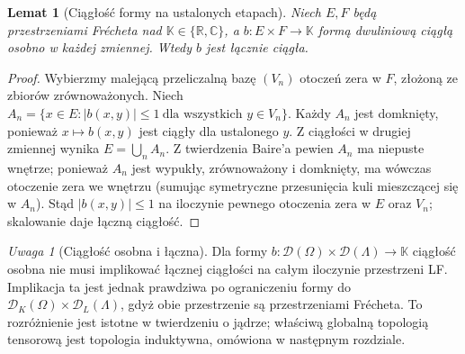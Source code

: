 \documentclass[11pt,a4paper]{article}
\numberwithin{equation}{section}
\theoremstyle{plain}
\newtheorem{lemat}[twierdzenie]{Lemat}
\theoremstyle{definition}
\theoremstyle{remark}
\newtheorem{uwaga}[twierdzenie]{Uwaga}
\newcommand{\R}{\mathbb R}
\newcommand{\C}{\mathbb C}
\newcommand{\K}{\mathbb K}
\begin{document}
\begin{lemat}[Ciągłość formy na ustalonych etapach]
\label{lem:separate-joint23}
Niech $E,F$ będą przestrzeniami Frécheta nad
$\K\in\{\R,\C\}$, a $b:E\times F\to\K$
formą dwuliniową ciągłą osobno w każdej zmiennej.
Wtedy $b$ jest łącznie ciągła.
\end{lemat}
\begin{proof}
Wybierzmy malejącą przeliczalną bazę
$(V_n)$ otoczeń zera w $F$, złożoną ze zbiorów
zrównoważonych. Niech
$A_n=\{x\in E: |b(x,y)|\le1\ \text{dla wszystkich }y\in V_n\}$.
Każdy $A_n$ jest domknięty, ponieważ $x\mapsto b(x,y)$
jest ciągły dla ustalonego $y$. Z ciągłości w drugiej
zmiennej wynika $E=\bigcup_n A_n$.
Z twierdzenia Baire'a pewien $A_n$ ma niepuste wnętrze;
ponieważ $A_n$ jest wypukły, zrównoważony i domknięty,
ma wówczas otoczenie zera we wnętrzu (sumując
symetryczne przesunięcia kuli mieszczącej się w $A_n$).
Stąd $|b(x,y)|\le1$ na iloczynie pewnego otoczenia
zera w $E$ oraz $V_n$; skalowanie daje łączną ciągłość.
\end{proof}

\begin{uwaga}[Ciągłość osobna i łączna]
\label{rem:kernel-separate23}
Dla formy $b:\mathcal D(\Omega)\times\mathcal D(\Lambda)\to\K$
ciągłość osobna nie musi implikować łącznej ciągłości na
całym iloczynie przestrzeni LF. Implikacja ta jest jednak
prawdziwa po ograniczeniu formy do
$\mathcal D_K(\Omega)\times\mathcal D_L(\Lambda)$,
gdyż obie przestrzenie są przestrzeniami Frécheta.
To rozróżnienie jest istotne w twierdzeniu o jądrze;
właściwą globalną topologią tensorową jest topologia
induktywna, omówiona w następnym rozdziale.
\end{uwaga}
\end{document}
